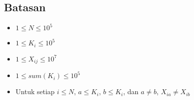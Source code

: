 \documentclass{article}
\begin{document}
\subsection*{Batasan}

\begin{itemize}
	\item $1 \leq N \leq 10^5$
    \item $1 \leq K_i \leq 10^5$
    \item $1 \leq X_{ij} \leq 10^7$
    \item $1 \leq sum(K_i) \leq 10^5$
    \item Untuk setiap $i \leq N$, $a \leq K_i$, $b \leq K_i$, dan $a \neq b$, $X_{ia} \neq X_{ib}$
\end{itemize}
\end{document}
